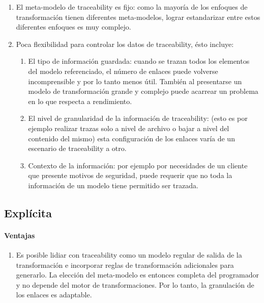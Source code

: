 \documentclass[a4paper,12pt,oneside,spanish]{book}
\begin{document}
\begin{enumerate}

\item El meta-modelo de traceability es fijo: como la mayoría de los enfoques de transformación tienen diferentes meta-modelos, lograr estandarizar entre estos diferentes enfoques es muy complejo.

\item Poca flexibilidad para controlar los datos de traceability, ésto incluye:

\begin{enumerate}

\item El tipo de información guardada: cuando se trazan todos los elementos del modelo referenciado, el número de enlaces puede volverse incomprensible y por lo tanto menos útil. También al presentarse un modelo de transformación grande y complejo puede acarrear un problema en lo que respecta a rendimiento.

\item El nivel de granularidad de la información de traceability: (esto es por ejemplo realizar trazas solo a nivel de archivo o bajar a nivel del contenido del mismo) esta configuración de los enlaces varía de un escenario de traceability a otro.

\item Contexto de la información: por ejemplo por necesidades de un cliente que presente motivos de seguridad, puede requerir que no toda la información de un modelo tiene permitido ser trazada.

\end{enumerate}

\end{enumerate}


\subsection{Explícita}

\paragraph{Ventajas}

\begin{enumerate}

\item Es posible lidiar con traceability como un modelo regular de salida de la transformación e incorporar reglas de transformación adicionales para generarlo. La elección del meta-modelo es entonces completa del programador y no depende del motor de transformaciones. Por lo tanto, la granulación de los enlaces es adaptable.

\end{enumerate}
\end{document}

